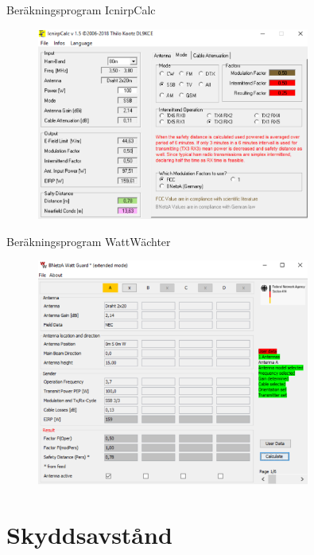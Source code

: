 \documentclass{beamer}
\begin{document}
\begin{frame}{Beräkningsprogram IcnirpCalc}

\begin{figure}[h]
	\includegraphics[width=0.8\textwidth]{images/IcnirpCalc.pdf}
\end{figure}

\end{frame}

\begin{frame}{Beräkningsprogram WattWächter}

\begin{figure}[h]
	\includegraphics[width=0.8\textwidth]{images/Wattwaechter.pdf}
\end{figure}

\end{frame}

\section{Skyddsavstånd}
\end{document}

